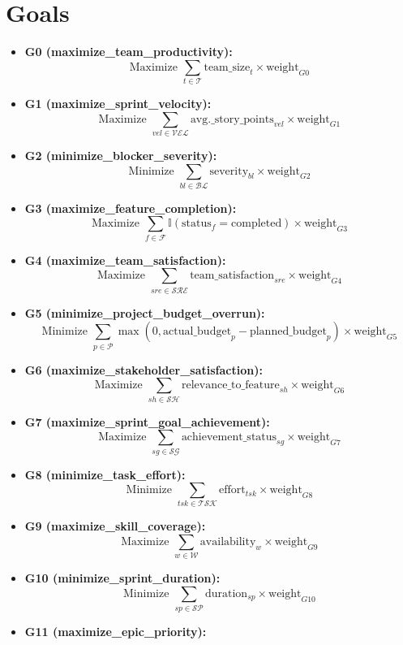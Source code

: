 \documentclass{article}
\begin{document}
\section{Goals}
\begin{itemize}
    \item \textbf{G0 (maximize\_team\_productivity):}
    \[
    \text{Maximize } \sum_{t \in \mathcal{T}} \text{team\_size}_t \times \text{weight}_{G0}
    \]
    \item \textbf{G1 (maximize\_sprint\_velocity):}
    \[
    \text{Maximize } \sum_{vel \in \mathcal{VEL}} \text{avg.\_story\_points}_{vel} \times \text{weight}_{G1}
    \]
    \item \textbf{G2 (minimize\_blocker\_severity):}
    \[
    \text{Minimize } \sum_{bl \in \mathcal{BL}} \text{severity}_{bl} \times \text{weight}_{G2}
    \]
    \item \textbf{G3 (maximize\_feature\_completion):}
    \[
    \text{Maximize } \sum_{f \in \mathcal{F}} \mathbb{I}(\text{status}_f = \text{completed}) \times \text{weight}_{G3}
    \]
    \item \textbf{G4 (maximize\_team\_satisfaction):}
    \[
    \text{Maximize } \sum_{sre \in \mathcal{SRE}} \text{team\_satisfaction}_{sre} \times \text{weight}_{G4}
    \]
    \item \textbf{G5 (minimize\_project\_budget\_overrun):}
    \[
    \text{Minimize } \sum_{p \in \mathcal{P}} \max(0, \text{actual\_budget}_p - \text{planned\_budget}_p) \times \text{weight}_{G5}
    \]
    \item \textbf{G6 (maximize\_stakeholder\_satisfaction):}
    \[
    \text{Maximize } \sum_{sh \in \mathcal{SH}} \text{relevance\_to\_feature}_{sh} \times \text{weight}_{G6}
    \]
    \item \textbf{G7 (maximize\_sprint\_goal\_achievement):}
    \[
    \text{Maximize } \sum_{sg \in \mathcal{SG}} \text{achievement\_status}_{sg} \times \text{weight}_{G7}
    \]
    \item \textbf{G8 (minimize\_task\_effort):}
    \[
    \text{Minimize } \sum_{tsk \in \mathcal{TSK}} \text{effort}_{tsk} \times \text{weight}_{G8}
    \]
    \item \textbf{G9 (maximize\_skill\_coverage):}
    \[
    \text{Maximize } \sum_{w \in \mathcal{W}} \text{availability}_w \times \text{weight}_{G9}
    \]
    \item \textbf{G10 (minimize\_sprint\_duration):}
    \[
    \text{Minimize } \sum_{sp \in \mathcal{SP}} \text{duration}_{sp} \times \text{weight}_{G10}
    \]
    \item \textbf{G11 (maximize\_epic\_priority):}

\end{itemize}
\end{document}
